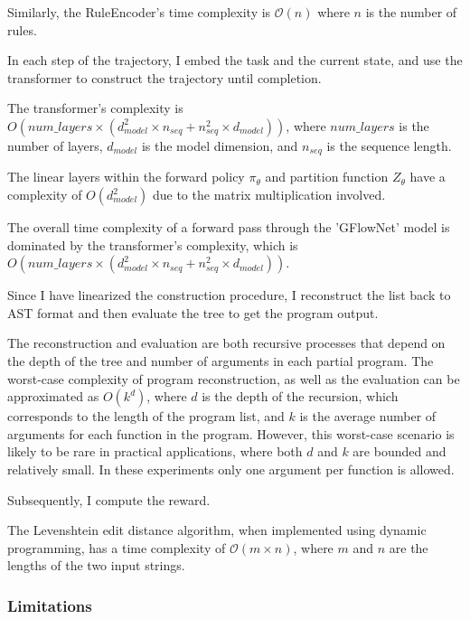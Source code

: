 Similarly, the RuleEncoder's time complexity is \(\mathcal{O}(n)\) where \(n\) is the number of rules.

In each step of the trajectory, I embed the task and the current state, and use the transformer to construct the trajectory until completion. 

The transformer's complexity is \(O(num\_layers \times (d_{model}^2 \times n_{seq} + n_{seq}^2 \times d_{model}))\), where \(num\_layers\) is the number of layers, \(d_{model}\) is the model dimension, and \(n_{seq}\) is the sequence length.

The linear layers within the forward policy $\pi_\theta$ and partition function $Z_\theta$ have a complexity of \(O(d_{model}^2)\) due to the matrix multiplication involved.

The overall time complexity of a forward pass through the 'GFlowNet' model is dominated by the transformer's complexity, which is \(O(num\_layers \times (d_{model}^2 \times n_{seq} + n_{seq}^2 \times d_{model}))\).


Since I have linearized the construction procedure, I reconstruct the list back to AST format and then evaluate the tree to get the program output.

The reconstruction and evaluation are both recursive processes that depend on the depth of the tree and number of arguments in each partial program. 
The worst-case complexity of program reconstruction, as well as the evaluation can be approximated as \(O(k^d)\), where \(d\) is the depth of the recursion, which corresponds to the length of the program list, and \(k\) is the average number of arguments for each function in the program. However, this worst-case scenario is likely to be rare in practical applications, where both \(d\) and \(k\) are bounded and relatively small. In these experiments only one argument per function is allowed.

Subsequently, I compute the reward.

The Levenshtein edit distance algorithm, when implemented using dynamic programming, has a time complexity of 
$\mathcal{O}(m \times n)$, where $m$ and  $n$ are the lengths of the two input strings.



\subsubsection{Limitations}

